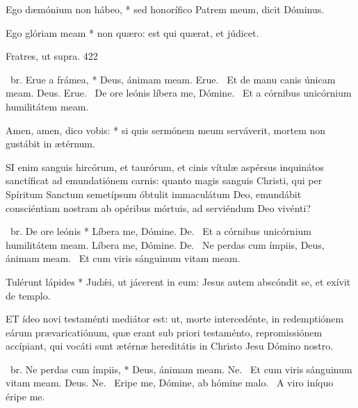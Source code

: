 
 Ego dæmónium non hábeo, * sed honorífico Patrem meum, dicit Dóminus.



 Ego glóriam meam * non quæro: est qui quærat, et júdicet.

 Fratres, ut supra. 422

\R\ br. Erue a frámea, * Deus, ánimam meam. Erue. \V\ Et de manu canis únicam meam. Deus. Erue. \V\ De ore leónis líbera me, Dómine. \R\ Et a córnibus unicórnium humilitátem meam.


 Amen, amen, dico vobis: * si quis sermónem meum serváverit, mortem non gustábit in ætérnum.


\lettrine[lines=2]{S}{I} enim sanguis hircórum, et taurórum, et cinis vítulæ aspérsus inquinátos sanctíficat ad emundatiónem carnis: quanto magis sanguis Christi, qui per Spíritum Sanctum semetípsum óbtulit immaculátum Deo, emundábit consciéntiam nostram ab opéribus mórtuis, ad serviéndum Deo vivénti?

\R\ br. De ore leónis * Líbera me, Dómine. De. \V\ Et a córnibus unicórnium humilitátem meam. Líbera me, Dómine. De. \V\ Ne perdas cum ímpiis, Deus, ánimam meam. \R\ Et cum viris sánguinum vitam meam.


 Tulérunt lápides * Judǽi, ut jácerent in eum: Jesus autem abscóndit se, et exívit de templo.


\lettrine[lines=2]{E}{T} ídeo novi testaménti mediátor est: ut, morte intercedénte, in redemptiónem eárum prævaricatiónum, quæ erant sub priori testaménto, repromissiónem accípiant, qui vocáti sunt ætérnæ hereditátis in Christo Jesu Dómino nostro.

\R\ br. Ne perdas cum ímpiis, * Deus, ánimam meam. Ne. \V\ Et cum viris sánguinum vitam meam. Deus. Ne. \V\ Eripe me, Dómine, ab hómine malo. \R\ A viro iníquo éripe me.




